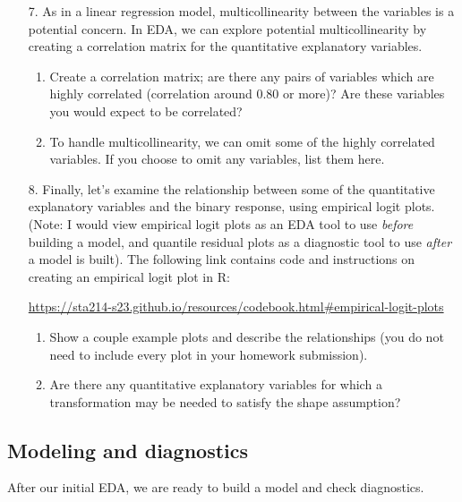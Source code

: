 \documentclass[11pt]{article}
\begin{document}
\begin{enumerate}
\item[7.] As in a linear regression model, multicollinearity between the variables is a potential concern. In EDA, we can explore potential multicollinearity by creating a correlation matrix for the quantitative explanatory variables. 

\begin{enumerate}
\item Create a correlation matrix; are there any pairs of variables which are highly correlated (correlation around 0.80 or more)? Are these variables you would expect to be correlated?

\item To handle multicollinearity, we can omit some of the highly correlated variables. If you choose to omit any variables, list them here.
\end{enumerate}

\item[8.] Finally, let's examine the relationship between some of the quantitative explanatory variables and the binary response, using empirical logit plots. (Note: I would view empirical logit plots as an EDA tool to use \textit{before} building a model, and quantile residual plots as a diagnostic tool to use \textit{after} a model is built). The following link contains code and instructions on creating an empirical logit plot in R:

\url{https://sta214-s23.github.io/resources/codebook.html#empirical-logit-plots}

\begin{enumerate}
\item Show a couple example plots and describe the relationships (you do not need to include every plot in your homework submission).

\item Are there any quantitative explanatory variables for which a transformation may be needed to satisfy the shape assumption?
\end{enumerate}

\end{enumerate}

\subsection*{Modeling and diagnostics}

After our initial EDA, we are ready to build a model and check diagnostics.
\end{document}
